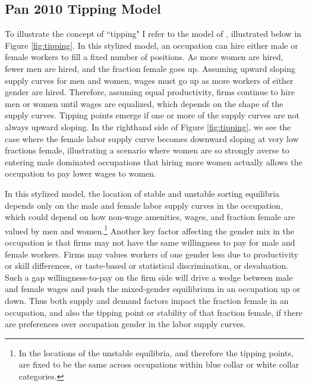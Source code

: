 \documentclass[12pt]{article}
\begin{document}





\clearpage 
\newpage
\subsection{Pan 2010 Tipping Model}\label{sec.Pan}
To illustrate the concept of ``tipping" I refer to the model of , illustrated below in Figure \ref{fig:tipping}. In this stylized model, an occupation can hire either male or female workers to fill a fixed number of positions. As more women are hired, fewer men are hired, and the fraction female goes up. Assuming upward sloping supply curves for men and women, wages must go up as more workers of either gender are hired. Therefore, assuming equal productivity, firms continue to hire men or women until wages are equalized, which depends on the shape of the supply curves. Tipping points emerge if one or more of the supply curves are not always upward sloping. In the righthand side of Figure \ref{fig:tipping}, we see the case where the female labor supply curve becomes downward sloping at very low fractions female, illustrating a scenario where women are so strongly averse to entering male dominated occupations that hiring more women actually allows the occupation to pay lower wages to women.


In this stylized model, the location of stable and unstable sorting equilibria depends only on the male and female labor supply curves in the occupation, which could depend on how non-wage amenities, wages, and fraction female are valued by men and women.\footnote{In  the locations of the unstable equilibria, and therefore the tipping points, are fixed to be the same across occupations within blue collar or white collar categories.} Another key factor affecting the gender mix in the occupation is that firms may not have the same willingness to pay for male and female workers. Firms may values workers of one gender less due to productivity or skill differences, or taste-based or statistical discrimination, or devaluation. Such a gap willingness-to-pay on the firm side will drive a wedge between male and female wages and push the mixed-gender equilibrium in an occupation up or down. Thus both supply and demand factors impact the fraction female in an occupation, and also the tipping point or stability of that fraction female, if there are preferences over occupation gender in the labor supply curves.
\end{document}
